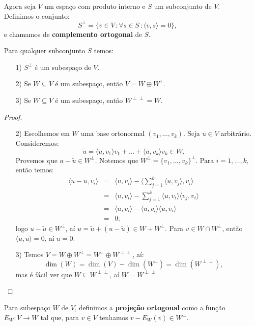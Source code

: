 \documentclass[11pt,twoside,a4paper]{book}
\begin{document}
\begin{definicao}
Agora seja $V$ um espaço com produto interno e $S$ um subconjunto de $V$. Definimos o conjunto:
\[
S^\perp=\{v\in V\,\colon \forall s\in S \,\colon\langle v,s\rangle=0\},
\]
e chamamos de \textbf{complemento ortogonal} de $S$.
\end{definicao}

\begin{proposicao}
Para qualquer subconjunto $S$ temos:
\begin{itemize}
\item[1)] $S^\perp$ é um subespaço de $V$.
\item[2)] Se $W\subseteq V$ é um subespaço, então $V=W\oplus W^\perp$.
\item[3)] Se $W\subseteq V$ é um subespaço, então $W^{\perp\perp}=W$.
\end{itemize}
\end{proposicao}
\begin{proof}
\begin{itemize}
\item[2)] Escolhemos em $W$ uma base ortonormal $(v_1,\dots,v_k)$. Seja $u\in V$ arbitrário. Consideremos:
\[
\tilde{u}=\langle u,v_1\rangle v_1+\dots+\langle u,v_k\rangle v_k\in W.
\]
Provemos que $u-\tilde{u}\in W^\perp$. Notemos que $W^\perp=\{v_1,\dots,v_k\}^\perp$. Para $i=1,\dots,k$, então temos:
\[
\begin{array}{rcl}
\langle u-\tilde{u},v_i\rangle&=&\langle u,v_i\rangle-\langle\sum_{j=1}^k\langle u,v_j\rangle,v_i\rangle\\
&=&\langle u,v_i\rangle-\sum_{j=1}^k\langle u,v_i\rangle\langle v_j,v_i\rangle\\
&=&\langle u,v_i\rangle-\langle u,v_i\rangle\langle u,v_i\rangle\\
&=&0;
\end{array}
\]
logo $u-\tilde{u}\in W^\perp$, aí $u=\tilde{u}+(u-\tilde{u})\in W+W^\perp$. Para $v\in W\cap W^\perp$, então $\langle u,u\rangle=0$, aí $u=0$.
\item[3)] Temos $V=W\oplus W^\perp=W^\perp\oplus W^{\perp\perp}$, aí:
\[
\dim(W)=\dim(V)-\dim(W^\perp)=\dim(W^{\perp\perp}),
\]
mas é fácil ver que $W\subseteq W^{\perp\perp}$, aí $W=W^{\perp\perp}$.
\end{itemize}
\end{proof}

\begin{definicao}
Para subespaço $W$ de $V$, definimos a \textbf{projeção ortogonal} como a função $E_W:V\rightarrow W$ tal que, para $v\in V$ tenhamos $v-E_W(v)\in W^\perp$.
\end{definicao}
\end{document}
